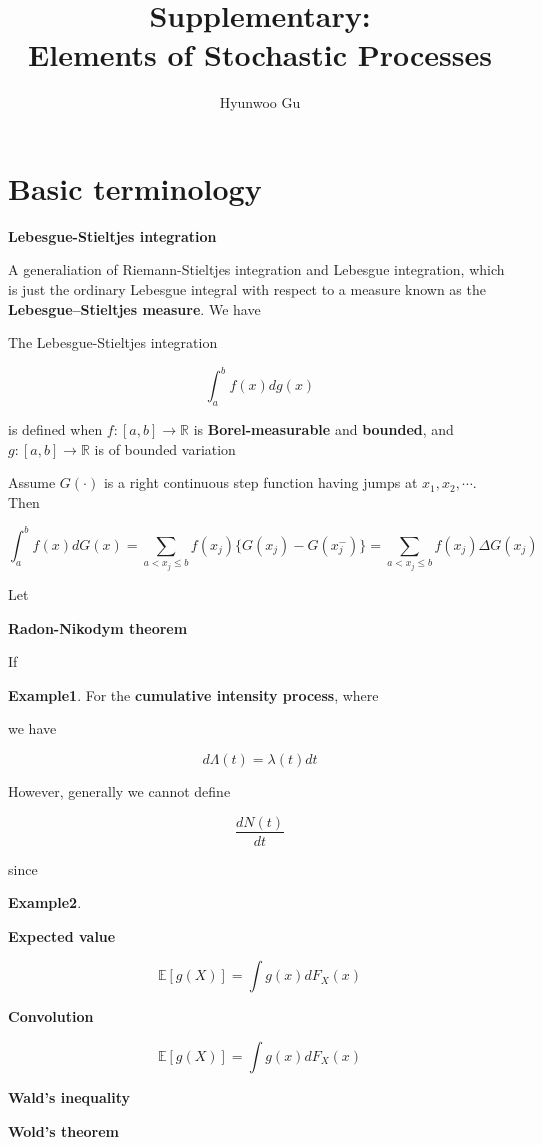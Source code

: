 \documentclass[12pt]{article}
\theoremstyle{nonumberbreak}
\begin{document}
\title{\textbf{Supplementary: \\ Elements of Stochastic Processes}}
\author{Hyunwoo Gu}
\date{}

\maketitle



\section{Basic terminology}

\textbf{Lebesgue-Stieltjes integration}

A generaliation of Riemann-Stieltjes integration and Lebesgue integration, which is just the ordinary Lebesgue integral with respect to a measure known as the \textbf{Lebesgue–Stieltjes measure}. We have

\begin{center}

\end{center}


The Lebesgue-Stieltjes integration

$$
\int_a^b f(x) d g(x)
$$

is defined when $f: [a,b] \to \mathbb{R}$ is \textbf{Borel-measurable} and \textbf{bounded}, and $g : [a,b] \to \mathbb{R}$ is of bounded variation



Assume $G(\cdot)$ is a right continuous step function having jumps at $x_1,x_2,\cdots$. Then

$$
\int_a^b f(x) dG(x) = \sum_{a < x_j \le b} f(x_j) \{ G(x_j) - G(x_j^-) \} = \sum_{a < x_j \le b} f(x_j) \Delta G(x_j)
$$


Let 



\textbf{Radon-Nikodym theorem}

If 


\textbf{Example1}. For the \textbf{cumulative intensity process}, where



we have 

$$
d \Lambda(t) = \lambda(t) dt
$$

However, generally we cannot define

$$
\frac{dN(t)}{dt}
$$

since 

\textbf{Example2}.  


\textbf{Expected value}

$$
\mathbb{E}[g(X)] = \int g(x) dF_X(x)
$$


\textbf{Convolution}

$$
\mathbb{E}[g(X)] = \int g(x) dF_X(x)
$$



\textbf{Wald's inequality}



\textbf{Wold's theorem}
\end{document}
